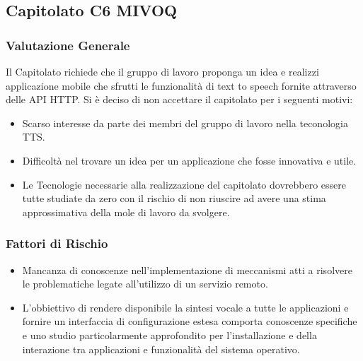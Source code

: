 \documentclass[12pt,a4paper]{article}
\begin{document}
\newpage
\subsection{Capitolato C6 MIVOQ}
\subsubsection{Valutazione Generale}

Il Capitolato richiede che il gruppo di lavoro proponga un idea e realizzi applicazione mobile che sfrutti le funzionalità di text to speech fornite attraverso delle API HTTP.
Si è deciso di non accettare il capitolato per i seguenti motivi:
\begin{itemize}
\item Scarso interesse da parte dei membri del gruppo di lavoro nella teconologia TTS.
\item Difficoltà nel trovare un idea per un applicazione che fosse innovativa e utile.
\item Le Tecnologie necessarie alla realizzazione del capitolato dovrebbero essere tutte studiate da zero con il rischio di non riuscire ad avere una stima approssimativa della mole di lavoro da svolgere.
\end{itemize}

\subsubsection{Fattori di Rischio}

\begin{itemize}
\item Mancanza di conoscenze nell'implementazione di meccanismi atti a risolvere le problematiche legate all'utilizzo di un servizio remoto.
\item L'obbiettivo di rendere disponibile la sintesi vocale a tutte le applicazioni e fornire un interfaccia di configurazione estesa comporta conoscenze specifiche e uno studio particolarmente approfondito per l'installazione e della interazione tra applicazioni e funzionalità del sistema operativo.
\end{itemize}
\end{document}
